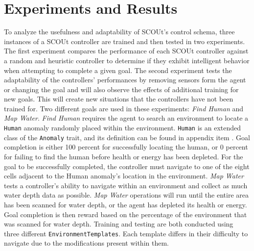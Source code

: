 

\chapter{Experiments and Results} \label{ch:experiments_and_results}
To analyze the usefulness and adaptability of SCOUt's control schema, three instances of a SCOUt controller are trained and then tested in two experiments.
The first experiment compares the performance of each SCOUt controller against a random and heuristic controller to determine if they exhibit intelligent behavior when attempting to complete a given goal.
The second experiment tests the adaptability of the controllers' performances by removing sensors form the agent or changing the goal and will also observe the effects of additional training for new goals.
This will create new situations that the controllers have not been trained for.
Two different goals are used in these experiments: \textit{Find Human} and \textit{Map Water}.
\textit{Find Human} requires the agent to search an environment to locate a \texttt{Human} anomaly randomly placed within the environment.
\texttt{Human} is an extended class of the \texttt{Anomaly} trait, and its definition can be found in appendix item .
Goal completion is either 100 percent for successfully locating the human, or 0 percent for failing to find the human before health or energy has been depleted.
For the goal to be successfully completed, the controller must navigate to one of the eight cells adjacent to the Human anomaly's location in the environment. 
\textit{Map Water} tests a controller's ability to navigate within an environment and collect as much water depth data as possible.
\textit{Map Water} operations will run until the entire area has been scanned for water depth, or the agent has depleted its health or energy.
Goal completion is then reward based on the percentage of the environment that was scanned for water depth.
Training and testing are both conducted using three different \texttt{EnvironmentTemplates}.
Each template differs in their difficulty to navigate due to the modifications present within them.

